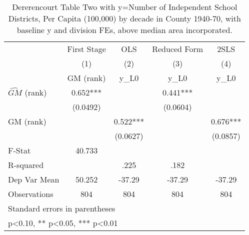 \begin{table}[htbp]\centering
\def\sym#1{\ifmmode^{#1}\else\(^{#1}\)\fi}
\caption{Dererencourt Table Two with y=Number of Independent School Districts, Per Capita (100,000) by decade in County 1940-70, with baseline y and division FEs, above median area incorporated.}
\begin{tabular}{l*{4}{c}}
\toprule
                    & First Stage   &         OLS   &Reduced Form   &        2SLS   \\
                    &\multicolumn{1}{c}{(1)}&\multicolumn{1}{c}{(2)}&\multicolumn{1}{c}{(3)}&\multicolumn{1}{c}{(4)}\\
                    &\multicolumn{1}{c}{GM  (rank)}&\multicolumn{1}{c}{y\_L0}&\multicolumn{1}{c}{y\_L0}&\multicolumn{1}{c}{y\_L0}\\
\midrule
$\hat{GM}$ (rank)   &       0.652***&               &       0.441***&               \\
                    &    (0.0492)   &               &    (0.0604)   &               \\
\addlinespace
GM  (rank)          &               &       0.522***&               &       0.676***\\
                    &               &    (0.0627)   &               &    (0.0857)   \\
\midrule
F-Stat              &      40.733   &               &               &               \\
R-squared           &               &        .225   &        .182   &               \\
Dep Var Mean        &      50.252   &      -37.29   &      -37.29   &      -37.29   \\
Observations        &         804   &         804   &         804   &         804   \\
\bottomrule
\multicolumn{5}{l}{\footnotesize Standard errors in parentheses}\\
\multicolumn{5}{l}{\footnotesize * p<0.10, ** p<0.05, *** p<0.01}\\
\end{tabular}
\end{table}
